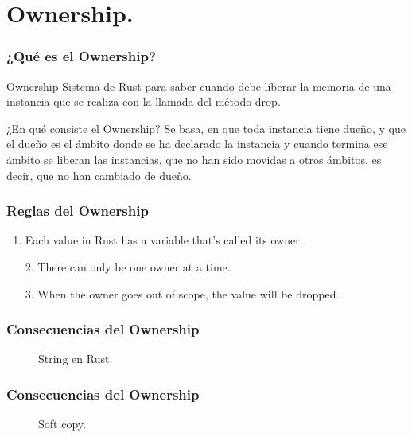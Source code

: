 \documentclass{beamer}
\begin{document}


\section{Ownership.}
\begin{frame}
  \frametitle{¿Qué es el Ownership?}
  \begin{block}{Ownership}
    Sistema de Rust para saber cuando debe liberar la memoria de una instancia que se realiza con la llamada del método drop.
  \end{block}
  \begin{block}{¿En qué consiste el Ownership?}
    Se basa, en que toda instancia tiene dueño, y que el dueño es el ámbito donde se ha declarado la instancia y cuando termina ese ámbito se liberan las instancias, que no han sido movidas a otros ámbitos, es decir, que no han cambiado de dueño.
  \end{block}
\end{frame}

\begin{frame}
  \frametitle{Reglas del Ownership}
  
\begin{enumerate}[1.]
  \item Each value in Rust has a variable that’s called its owner. 
  \pause
  \item[2.] There can only be one owner at a time.
  \pause  
  \item[3.] When the owner goes out of scope, the value will be dropped.
\end{enumerate}
\end{frame}

\begin{frame}
  \frametitle{Consecuencias del Ownership}
    \begin{figure}[0.6\textwidth]
      \center 
      \caption{String en Rust.}
      \label{fig:string}
    \end{figure}
\end{frame}

\begin{frame}
  \frametitle{Consecuencias del Ownership}
  \begin{figure}[0.5\textwidth]
    \center 
    \caption{Soft copy.}
    \label{fig:soft}
  \end{figure}
\end{frame}
\end{document}
